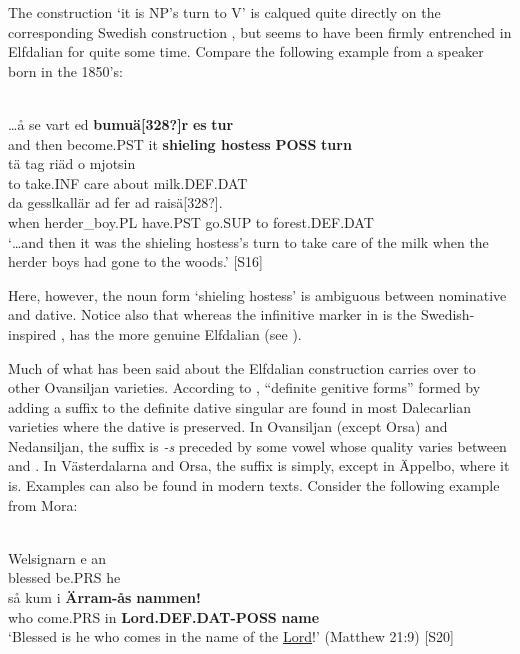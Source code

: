 The construction  ‘it is NP’s turn to V’ is calqued quite directly on the corresponding Swedish construction , but seems to have been firmly entrenched in Elfdalian for quite some time. Compare the following example from a speaker born in the 1850’s:

\ea\label{}
\\
\gll …å  se  vart  ed  \textbf{bumuä[328?]r} \textbf{es} \textbf{tur}\\
and  then  become.PST  it  \textbf{shieling hostess} \textbf{POSS} \textbf{turn}\\
\gll tä  tag  riäd   o  mjotsin\\
to  take.INF  care  about  milk.DEF.DAT\\
\gll da  gesslkallär  ad  fer  ad  raisä[328?].\\
when  herder\_boy.PL  have.PST  go.SUP  to  forest.DEF.DAT\\
\glt ‘…and then it was the shieling hostess’s turn to take care of the milk when the herder boys had gone to the woods.’ [S16]
\z

Here, however, the noun form  ‘shieling hostess’ is ambiguous between nominative and dative. Notice also that whereas the infinitive marker in  is the Swedish-inspired ,  has the more genuine Elfdalian  (see ). 

Much of what has been said about the Elfdalian construction carries over to other Ovansiljan varieties. According to \citet[170]{Levander1928}, “definite genitive forms” formed by adding a suffix to the definite dative singular are found in most Dalecarlian varieties where the dative is preserved. In Ovansiljan (except Orsa) and Nedansiljan, the suffix is\textit{ {}-s} preceded by some vowel whose quality varies between  and . In Västerdalarna and Orsa, the suffix is simply, except in Äppelbo, where it is. Examples can also be found in modern texts. Consider the following example from Mora:

\ea\label{}
\\
\gll Welsignarn  e  an\\
blessed  be.PRS  he\\
\gll så  kum  i  \textbf{Ärram-ås} \textbf{nammen!}\\
who  come.PRS  in  \textbf{Lord.DEF.DAT-POSS} \textbf{name}\\
\glt ‘Blessed is he who comes in the name of the \href{http://www.godrules.net/library/topics/topic1192.htm}{Lord}!’ (Matthew 21:9) [S20]
\z

